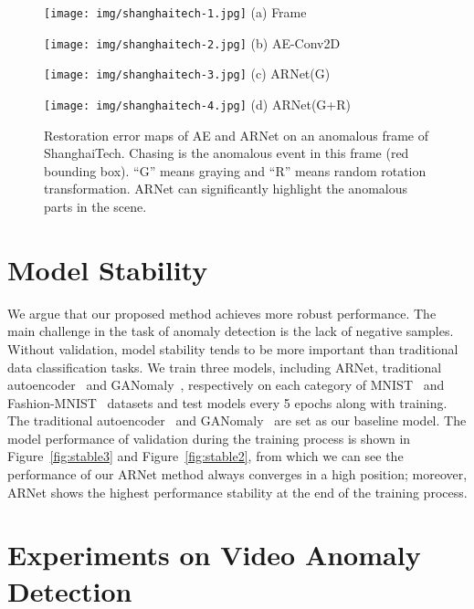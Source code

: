 \documentclass[journal]{IEEEtran}
\begin{document}
\begin{figure}[!h]
  \begin{minipage}[t]{0.114\textwidth}
\centering
\texttt{[image: img/shanghaitech-1.jpg]}
\footnotesize
(a) Frame
\end{minipage}
\begin{minipage}[t]{0.114\textwidth}
\centering
\texttt{[image: img/shanghaitech-2.jpg]}
\footnotesize
(b) AE-Conv2D
\end{minipage}
\begin{minipage}[t]{0.114\textwidth}
\centering
\texttt{[image: img/shanghaitech-3.jpg]}
\footnotesize
(c) ARNet(G)
\end{minipage}
\begin{minipage}[t]{0.114\textwidth}
\centering
\texttt{[image: img/shanghaitech-4.jpg]}
\footnotesize
(d) ARNet(G+R)
\end{minipage}
\caption{Restoration error maps of AE and ARNet on an anomalous frame of ShanghaiTech. Chasing is the anomalous event in this frame (red bounding box). ``G'' means graying and ``R'' means random rotation transformation. ARNet can significantly highlight the anomalous parts in the scene.}
  \label{fig:shanghaitech}
\end{figure}

\section{Model Stability}
We argue that our proposed method achieves more robust performance. The main challenge in the task of anomaly detection is the lack of negative samples. Without validation, model stability tends to be more important than traditional data classification tasks. We train three models, including ARNet, traditional autoencoder~\cite{masci2011stacked} and GANomaly~\cite{Akcay2018}, respectively on each category of MNIST~\cite{lecun1998mnist} and Fashion-MNIST~\cite{xiao2017fashion} datasets and test models every 5 epochs along with training. The traditional autoencoder~\cite{masci2011stacked} and GANomaly~\cite{Akcay2018} are set as our baseline model. The model performance of validation during the training process is shown in Figure~\ref{fig:stable3} and Figure~\ref{fig:stable2}, from which we can see the performance of our ARNet method always converges in a high position; moreover, ARNet shows the highest performance stability at the end of the training process.

\section{Experiments on Video Anomaly Detection}
\end{document}
